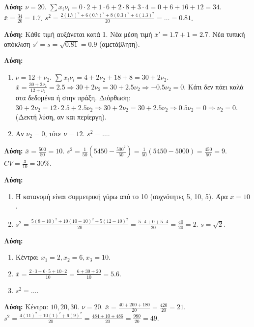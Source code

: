 \documentclass[11pt,a4paper,modern]{FFExercises}
\begin{document}
\askhsh
\textbf{Λύση:}
$\nu=20$. $\sum x_i \nu_i = 0\cdot2 + 1\cdot6 + 2\cdot8 + 3\cdot4 = 0+6+16+12=34$.
$\bar{x} = \frac{34}{20} = 1.7$.
$s^2 = \frac{2(1.7)^2 + 6(0.7)^2 + 8(0.3)^2 + 4(1.3)^2}{20} = \dots = 0.81$.

\askhsh
\textbf{Λύση:}
Κάθε τιμή αυξάνεται κατά 1.
Νέα μέση τιμή $\bar{x}' = 1.7 + 1 = 2.7$.
Νέα τυπική απόκλιση $s' = s = \sqrt{0.81} = 0.9$ (αμετάβλητη).

\askhsh
\textbf{Λύση:}
\begin{enumerate}
    \item $\nu = 12 + \nu_2$. $\sum x_i \nu_i = 4 + 2\nu_2 + 18 + 8 = 30 + 2\nu_2$.
    $\bar{x} = \frac{30+2\nu_2}{12+\nu_2} = 2.5 \Rightarrow 30+2\nu_2 = 30 + 2.5\nu_2 \Rightarrow -0.5\nu_2 = 0$.
    Κάτι δεν πάει καλά στα δεδομένα ή στην πράξη.
    Διόρθωση: $30+2\nu_2 = 12 \cdot 2.5 + 2.5\nu_2 \Rightarrow 30+2\nu_2 = 30+2.5\nu_2 \Rightarrow 0.5\nu_2=0 \Rightarrow \nu_2=0$.
    (Δεκτή λύση, αν και περίεργη).
    \item Αν $\nu_2=0$, τότε $\nu=12$.
    $s^2 = \dots$.
\end{enumerate}

\askhsh
\textbf{Λύση:}
$\bar{x} = \frac{500}{50} = 10$.
$s^2 = \frac{1}{50} (5450 - \frac{500^2}{50}) = \frac{1}{50} (5450 - 5000) = \frac{450}{50} = 9$.
$CV = \frac{3}{10} = 30\%$.

\askhsh
\textbf{Λύση:}
\begin{enumerate}
    \item Η κατανομή είναι συμμετρική γύρω από το 10 (συχνότητες 5, 10, 5). Άρα $\bar{x}=10$.
    \item $s^2 = \frac{5(8-10)^2 + 10(10-10)^2 + 5(12-10)^2}{20} = \frac{5\cdot4 + 0 + 5\cdot4}{20} = \frac{40}{20} = 2$.
    $s = \sqrt{2}$.
\end{enumerate}

\askhsh
\textbf{Λύση:}
\begin{enumerate}
    \item Κέντρα: $x_1=2, x_2=6, x_3=10$.
    \item $\bar{x} = \frac{2\cdot3 + 6\cdot5 + 10\cdot2}{10} = \frac{6+30+20}{10} = 5.6$.
    \item $s^2 = \dots$.
\end{enumerate}

\askhsh
\textbf{Λύση:}
Κέντρα: $10, 20, 30$.
$\nu=20$. $\bar{x} = \frac{40+200+180}{20} = \frac{420}{20} = 21$.
$s^2 = \frac{4(11)^2 + 10(1)^2 + 6(9)^2}{20} = \frac{484 + 10 + 486}{20} = \frac{980}{20} = 49$.
\end{document}
